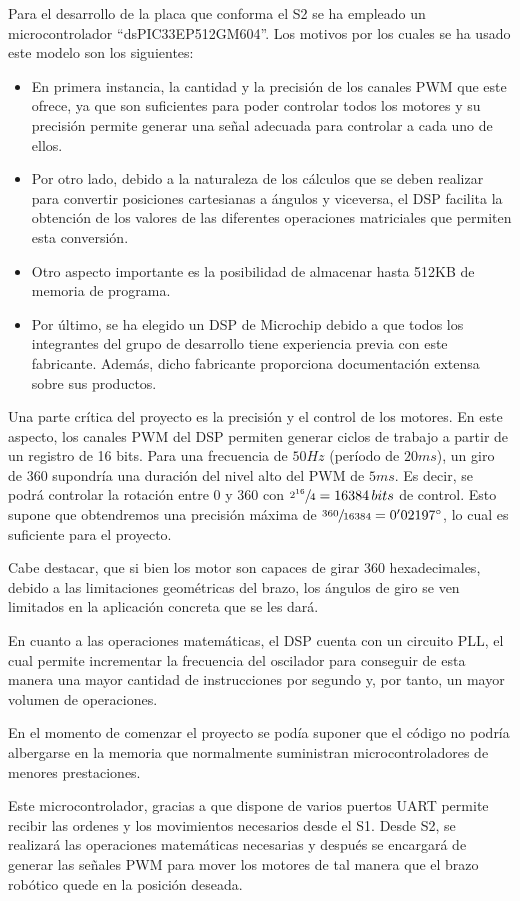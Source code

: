 Para el desarrollo de la placa que conforma el \ac{S2} se ha empleado un microcontrolador ``dsPIC33EP512GM604''.
Los motivos por los cuales se ha usado este modelo son los siguientes: 

\begin{itemize}
 \item En primera instancia, la cantidad y la precisión de los canales \ac{PWM} que este ofrece, ya que son suficientes para poder controlar todos los motores y su precisión permite generar una señal adecuada para controlar a cada uno de ellos.

 \item Por otro lado, debido a la naturaleza de los cálculos que se deben realizar para convertir posiciones cartesianas a ángulos y viceversa, el \ac{DSP} facilita la obtención de los valores de las diferentes operaciones matriciales que permiten esta conversión.

 \item Otro aspecto importante es la posibilidad de almacenar hasta 512KB de memoria de programa.

 \item Por último, se ha elegido un \ac{DSP} de Microchip debido a que todos los integrantes del grupo de desarrollo tiene experiencia previa con este fabricante. Además, dicho fabricante proporciona documentación extensa sobre sus productos.
\end{itemize}

Una parte crítica del proyecto es la precisión y el control de los motores. En este aspecto, los canales \ac{PWM} del \ac{DSP} permiten generar ciclos de trabajo a partir de un registro de 16 bits. Para una frecuencia de $50Hz$ (período de $20ms$), un giro de 360\degree{} supondría una duración del nivel alto del \ac{PWM} de $5ms$. Es decir, se podrá controlar la rotación entre 0\degree{} y 360\degree{} con $\sfrac{2^{16}}{4} = 16384\,bits$ de control. Esto supone que obtendremos una precisión máxima de $\sfrac{360}{16384} = 0'02197\degree{}$, lo cual es suficiente para el proyecto.

Cabe destacar, que si bien los motor son capaces de girar 360\degree{} hexadecimales, debido a las limitaciones geométricas del brazo, los ángulos de giro se ven limitados en la aplicación concreta que se les dará.

En cuanto a las operaciones matemáticas, el \ac{DSP} cuenta con un circuito \ac{PLL}, el cual permite incrementar la frecuencia del oscilador para conseguir de esta manera una mayor cantidad de instrucciones por segundo y, por tanto, un mayor volumen de operaciones.

En el momento de comenzar el proyecto se podía suponer que el código no podría albergarse en la memoria que normalmente suministran microcontroladores de menores prestaciones.

Este microcontrolador, gracias a que dispone de varios puertos \ac{UART} permite recibir las ordenes y los movimientos necesarios desde el \ac{S1}. Desde \ac{S2}, se realizará las operaciones matemáticas necesarias y después se encargará de generar las señales \ac{PWM} para mover los motores de tal manera que el brazo robótico quede en la posición deseada.
